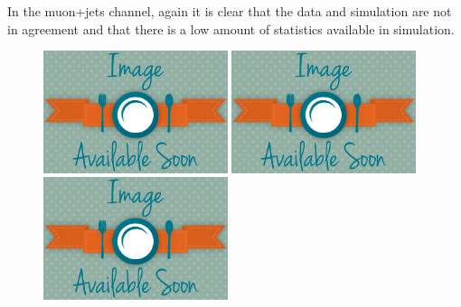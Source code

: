 In the muon+jets channel, again it is clear that the data and simulation are not in agreement and that there
is a low amount of statistics available in simulation.

 \begin{figure}[hbtp]
    \centering
     \includegraphics[width=0.48\textwidth]{Chapters/04_Analysis/04b_XSections/images/placeholder.png}\hfill
     \includegraphics[width=0.48\textwidth]{Chapters/04_Analysis/04b_XSections/images/placeholder.png}\\
     \includegraphics[width=0.48\textwidth]{Chapters/04_Analysis/04b_XSections/images/placeholder.png}\hfill

\end{figure}
